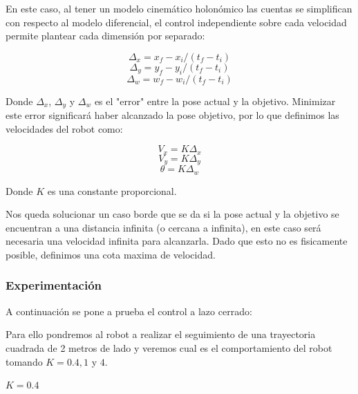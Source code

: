 En este caso, al tener un modelo cinemático holonómico las cuentas se simplifican con respecto al modelo diferencial, el control independiente sobre cada velocidad permite plantear cada  dimensión por separado:

$$\Delta_x = x_f - x_i / (t_f - t_i)$$
$$\Delta_y = y_f - y_i / (t_f - t_i)$$
$$\Delta_w = w_f - w_i / (t_f - t_i)$$

Donde $\Delta_x$, $\Delta_y$ y $\Delta_w$ es el "error" entre la pose actual y la objetivo. Minimizar este error significará haber alcanzado la pose objetivo, por lo que definimos las velocidades del robot como:

$$V_x = K \Delta_x $$
$$V_y = K \Delta_y $$
$$\theta = K \Delta_w $$

Donde $K$ es una constante proporcional.


Nos queda solucionar un caso borde que se da si la pose actual y la objetivo se encuentran a una distancia infinita (o cercana a infinita), en este caso será necesaria una velocidad infinita para alcanzarla. Dado que esto no es fisicamente posible, definimos una cota maxima de velocidad.


\subsubsection{Experimentación}

A continuación se pone a prueba el control a lazo cerrado:

Para ello pondremos al robot a realizar el seguimiento de una trayectoria cuadrada de 2 metros de lado y veremos cual es el comportamiento del robot tomando $K=0.4,1$ y $4$.

$K = 0.4$

